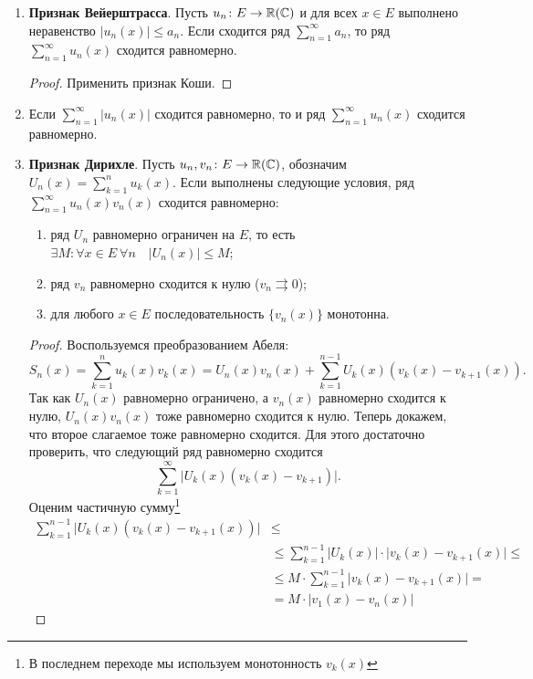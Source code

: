 \begin{prop}
\begin{enumerate}
		\item {\bf Признак Вейерштрасса}. Пусть $ u_n\colon E \to  \mathbb{R}(\mathbb{C})$ и для всех $ x \in E$ выполнено неравенство $ \lvert u_n(x)  \rvert \le a_n$. Если сходится ряд $ \sum_{n=1}^{\infty} a_n$, то ряд $ \sum_{n=1}^{\infty} u_n(x)$ сходится равномерно. 
			\begin{proof}
			    Применить признак Коши.
			\end{proof}
		\item Если $ \sum_{n=1}^{\infty} \lvert u_n(x) \rvert $ сходится равномерно, то и ряд $ \sum_{n=1}^{\infty} u_n(x)$ сходится равномерно.
		\item {\bf Признак Дирихле}. Пусть $ u_n, v_n \colon E \to \mathbb{R}(\mathbb{C})$, обозначим  $ U_n(x) = \sum_{k=1}^{n} u_k(x)$. Если выполнены следующие условия, ряд $ \sum_{n=1}^{\infty} u_n(x)v_n(x)$ сходится равномерно:
			\begin{enumerate}[noitemsep]
				\item ряд $ U_n$ равномерно ограничен на $ E$, то есть 
					$
						\exists M\colon \forall x \in E ~ \forall n \quad \lvert U_n(x) \rvert \le M
					$; 
				\item ряд $ v_n$ равномерно сходится к нулю ($ v_n \rightrightarrows 0$);
				\item для любого $ x \in E$ последовательность $ \{v_n(x)\}$ монотонна.
			\end{enumerate} 
			\begin{proof}
			    Воспользуемся преобразованием Абеля:
				\[
					S_n(x) = \sum_{k=1}^{n} u_k(x)v_k(x) = U_n(x)v_n(x) + \sum_{k=1}^{n-1} U_k(x) (v_k(x) - v_{k+1}(x))
				.\] 
				Так как  $ U_n(x)$ равномерно ограничено, а $ v_n(x) $ равномерно сходится к нулю, $ U_n(x)v_n(x)$ тоже равномерно сходится к нулю. Теперь докажем, что второе слагаемое тоже равномерно сходится. Для этого достаточно проверить, что следующий ряд равномерно сходится
				 \[
					 \sum_{k=1}^{\infty} \lvert U_k(x) (v_k(x) - v_{k+1}) \rvert 
				.\] 
				Оценим частичную сумму\footnote{В последнем переходе мы используем монотонность $ v_k(x)$}
				\[
				\begin{aligned}
					\sum_{k=1}^{n-1} \lvert U_k(x) (v_k(x) - v_{k+1}(x)) \rvert & \le \\
																				& \le \sum_{k=1}^{n-1} \lvert U_k(x) \rvert \cdot \lvert v_k(x) - v_{k+1}(x) \rvert \le  \\
																				& \le M \cdot \sum_{k=1}^{n-1} \lvert v_k(x) - v_{k+1}(x) \rvert = \\ 
																				& = M \cdot \lvert v_1(x) - v_n(x) \rvert 

\end{aligned}\]
\end{proof}
\end{enumerate}
\end{prop}
